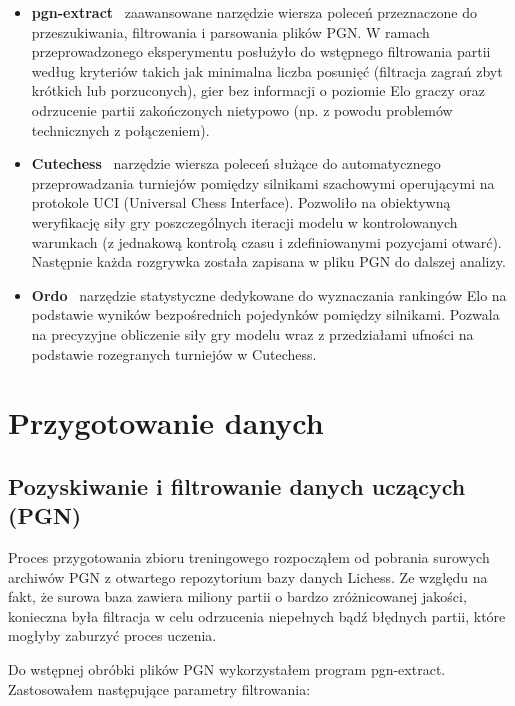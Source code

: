 \documentclass[12pt,a4paper]{report}
\begin{document}
\begin{itemize}
    \item \textbf{pgn-extract}~\cite{pgnextract} zaawansowane narzędzie wiersza poleceń przeznaczone do przeszukiwania, filtrowania i parsowania plików PGN. W ramach przeprowadzonego eksperymentu posłużyło do wstępnego filtrowania partii według kryteriów takich jak minimalna liczba posunięć (filtracja zagrań zbyt krótkich lub porzuconych), gier bez informacji o poziomie Elo graczy oraz odrzucenie partii zakończonych nietypowo (np. z powodu problemów technicznych z połączeniem).
    \item \textbf{Cutechess}~\cite{cutechess} narzędzie wiersza poleceń służące do automatycznego przeprowadzania turniejów pomiędzy silnikami szachowymi operującymi na protokole UCI (Universal Chess Interface). Pozwoliło na obiektywną weryfikację siły gry poszczególnych iteracji modelu w kontrolowanych warunkach (z jednakową kontrolą czasu i zdefiniowanymi pozycjami otwarć). Następnie każda rozgrywka została zapisana w pliku PGN do dalszej analizy.
    \item \textbf{Ordo}~\cite{ordo} narzędzie statystyczne dedykowane do wyznaczania rankingów Elo na podstawie wyników bezpośrednich pojedynków pomiędzy silnikami. Pozwala na precyzyjne obliczenie siły gry modelu wraz z przedziałami ufności na podstawie rozegranych turniejów w Cutechess.
\end{itemize}

\chapter{Przygotowanie danych}

\section{Pozyskiwanie i filtrowanie danych uczących (PGN)}

Proces przygotowania zbioru treningowego rozpocząłem od pobrania surowych archiwów PGN z otwartego repozytorium bazy danych Lichess. Ze względu na fakt, że surowa baza zawiera miliony partii o bardzo zróżnicowanej jakości, konieczna była filtracja w celu odrzucenia niepełnych bądź błędnych partii, które mogłyby zaburzyć proces uczenia.

Do wstępnej obróbki plików PGN wykorzystałem program pgn-extract. Zastosowałem następujące parametry filtrowania:
\end{document}
